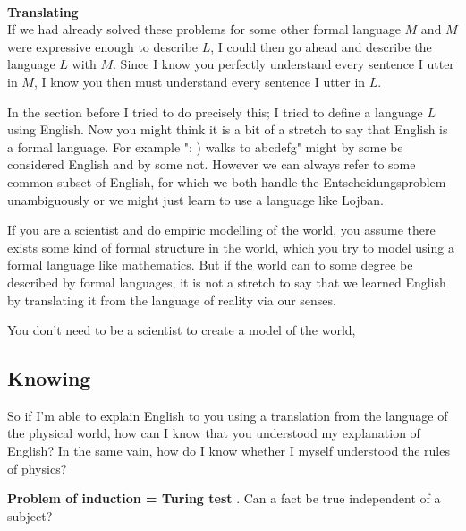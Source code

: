 


\

\textbf{Translating} \\
If we had already solved these problems for some other formal language $M$ and $M$ were expressive enough to describe $L$, I could then go ahead and describe the language $L$ with $M$. Since I know you perfectly understand every sentence I utter in $M$, I know you then must understand every sentence I utter in $L$.

In the section before I tried to do precisely this; I tried to define a language $L$ using English. Now you might think it is a bit of a stretch to say that English is a formal language. For example ": ) walks to abcdefg" might by some be considered English and by some not. However we can always refer to some common subset of English, for which we both handle the Entscheidungsproblem unambiguously or we might just learn to use a language like Lojban.

If you are a scientist and do empiric modelling of the world, you assume there exists some kind of formal structure in the world, which you try to model using a formal language like mathematics. But if the world can to some degree be described by formal languages, it is not a stretch to say that we learned English by translating it from the language of reality via our senses.

You don't need to be a scientist to create a model of the world, 
\subsection{Knowing}
So if I'm able to explain English to you using a translation from the language of the physical world, how can I know that you understood my explanation of English? In the same vain, how do I know whether I myself understood the rules of physics?



\textbf{Problem of induction = Turing test} . Can a fact be true independent of a subject?

